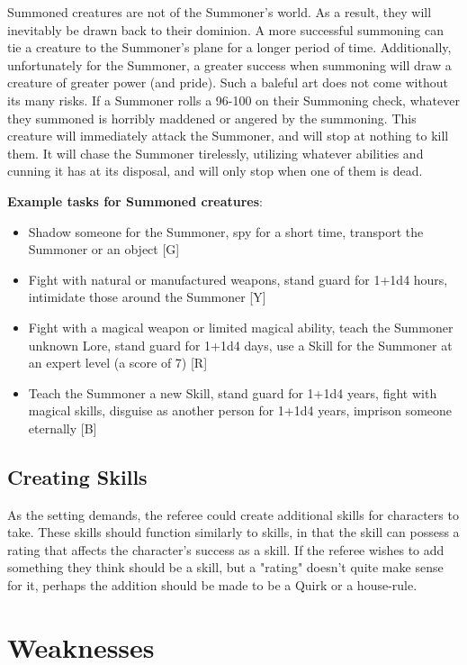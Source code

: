 \documentclass[oneside]{book}
\begin{document}
\begin{multicols}{2}
Summoned creatures are not of the Summoner's world. As a result, they will inevitably be drawn back to their dominion. A more successful summoning can tie a creature to the Summoner's plane for a longer period of time. Additionally, unfortunately for the Summoner, a greater success when summoning will draw a creature of greater power (and pride). Such a baleful art does not come without its many risks. If a Summoner rolls a 96-100 on their Summoning check, whatever they summoned is horribly maddened or angered by the summoning. This creature will immediately attack the Summoner, and will stop at nothing to kill them. It will chase the Summoner tirelessly, utilizing whatever abilities and cunning it has at its disposal, and will only stop when one of them is dead.

\textbf{Example tasks for Summoned creatures}: 
	\begin{itemize}
		\setlength{\itemsep}{0cm}%
  		\setlength{\parskip}{0cm}%
		\item{ \small Shadow someone for the Summoner, spy for a short time, transport the Summoner or an object [G]}
		\item{ \small Fight with natural or manufactured weapons, stand guard for 1+1d4 hours, intimidate those around the Summoner  [Y]}
		\item{ \small Fight with a magical weapon or limited magical ability, teach the Summoner unknown Lore, stand guard for 1+1d4 days, use a Skill for the Summoner at an expert level (a score of 7) [R]}
		\item{ \small Teach the Summoner a new Skill, stand guard for 1+1d4 years, fight with magical skills, disguise as another person for 1+1d4 years, imprison someone eternally  [B]}
	\end{itemize}
	
\section{Creating Skills}
As the setting demands, the referee could create additional skills for characters to take. These skills should function similarly to skills, in that the skill can possess a rating that affects the character's success as a skill. If the referee wishes to add something they think should be a skill, but a "rating" doesn't quite make sense for it, perhaps the addition should be made to be a Quirk or a house-rule. 
\end{multicols}

\chapter{Weaknesses}
\end{document}

